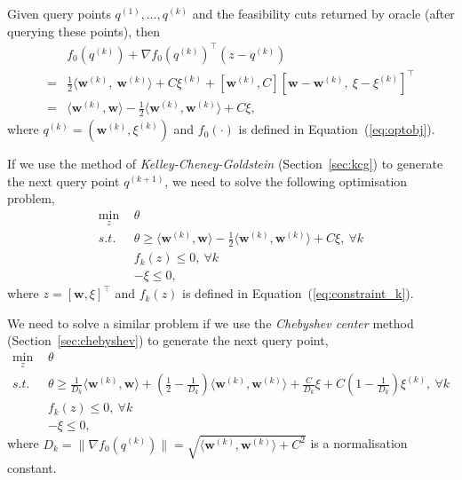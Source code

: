 Given query points $q^{(1)}, \dots, q^{(k)}$ and the feasibility cuts returned by oracle (after querying these points), then
\begin{align*}
 & f_0(q^{(k)}) + \nabla f_0(q^{(k)})^\top (z - q^{(k)}) \\
=& \frac{1}{2} \langle \mathbf{w}^{(k)},~ \mathbf{w}^{(k)} \rangle + C\xi^{(k)} + 
   \left[ \mathbf{w}^{(k)}, C \right] \left[ \mathbf{w} - \mathbf{w}^{(k)},~ \xi - \xi^{(k)} \right]^\top  \\
=& \langle \mathbf{w}^{(k)}, \mathbf{w} \rangle - \frac{1}{2} \langle \mathbf{w}^{(k)}, \mathbf{w}^{(k)} \rangle + C\xi,
\end{align*}
where $q^{(k)} = (\mathbf{w}^{(k)}, \xi^{(k)})$ and $f_0(\cdot)$ is defined in Equation~(\ref{eq:optobj}).

If we use the method of \emph{Kelley-Cheney-Goldstein} (Section~\ref{sec:kcg}) to generate the next query point $q^{(k+1)}$,
we need to solve the following optimisation problem,
\begin{equation}
\label{eq:1slack_kcg}
\begin{aligned}
\min_{z} ~& \theta \\
s.t.~~ ~& \theta \ge \langle \mathbf{w}^{(k)}, \mathbf{w} \rangle - \frac{1}{2} \langle \mathbf{w}^{(k)}, \mathbf{w}^{(k)} \rangle + C\xi,~ \forall k \\
        & f_k(z) \le 0,~ \forall k \\
        & -\xi \le 0,
\end{aligned}
\end{equation}
where $z = [\mathbf{w}, \xi]^\top$ and $f_k(z)$ is defined in Equation~(\ref{eq:constraint_k}).


We need to solve a similar problem if we use the \emph{Chebyshev center} method (Section~\ref{sec:chebyshev}) to generate the next query point,
\begin{equation}
\label{eq:1slack_chebyshev}
\begin{aligned}
\min_{z} ~& \theta \\
s.t.~~ ~& \theta \ge 
          \frac{1}{D_k} \langle \mathbf{w}^{(k)}, \mathbf{w} \rangle + 
          (\frac{1}{2} - \frac{1}{D_k}) \langle \mathbf{w}^{(k)}, \mathbf{w}^{(k)} \rangle + 
          \frac{C}{D_k}\xi + C (1 - \frac{1}{D_k}) \xi^{(k)},~ \forall k \\
        & f_k(z) \le 0,~ \forall k \\
        & -\xi \le 0,
\end{aligned}
\end{equation}
where $D_k = \|\nabla f_0(q^{(k)})\| = \sqrt{\langle \mathbf{w}^{(k)}, \mathbf{w}^{(k)} \rangle + C^2}$ is a normalisation constant.



